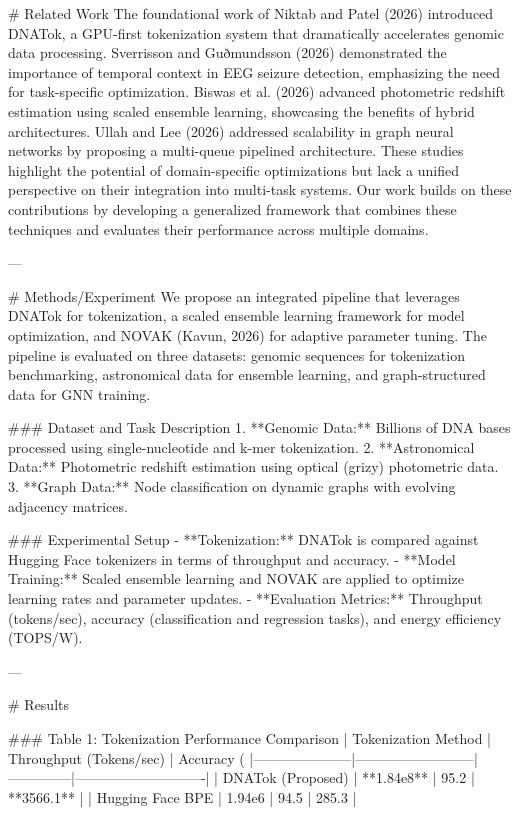 # Related Work  
The foundational work of Niktab and Patel (2026) introduced DNATok, a GPU-first tokenization system that dramatically accelerates genomic data processing. Sverrisson and Guðmundsson (2026) demonstrated the importance of temporal context in EEG seizure detection, emphasizing the need for task-specific optimization. Biswas et al. (2026) advanced photometric redshift estimation using scaled ensemble learning, showcasing the benefits of hybrid architectures. Ullah and Lee (2026) addressed scalability in graph neural networks by proposing a multi-queue pipelined architecture. These studies highlight the potential of domain-specific optimizations but lack a unified perspective on their integration into multi-task systems. Our work builds on these contributions by developing a generalized framework that combines these techniques and evaluates their performance across multiple domains.

---

# Methods/Experiment  
We propose an integrated pipeline that leverages DNATok for tokenization, a scaled ensemble learning framework for model optimization, and NOVAK (Kavun, 2026) for adaptive parameter tuning. The pipeline is evaluated on three datasets: genomic sequences for tokenization benchmarking, astronomical data for ensemble learning, and graph-structured data for GNN training.  

### Dataset and Task Description  
1. **Genomic Data:** Billions of DNA bases processed using single-nucleotide and k-mer tokenization.  
2. **Astronomical Data:** Photometric redshift estimation using optical (grizy) photometric data.  
3. **Graph Data:** Node classification on dynamic graphs with evolving adjacency matrices.  

### Experimental Setup  
- **Tokenization:** DNATok is compared against Hugging Face tokenizers in terms of throughput and accuracy.  
- **Model Training:** Scaled ensemble learning and NOVAK are applied to optimize learning rates and parameter updates.  
- **Evaluation Metrics:** Throughput (tokens/sec), accuracy (classification and regression tasks), and energy efficiency (TOPS/W).  

---

# Results  

### Table 1: Tokenization Performance Comparison  
| Tokenization Method | Throughput (Tokens/sec) | Accuracy (%
|---------------------|--------------------------|--------------|----------------------------|  
| DNATok (Proposed)   | **1.84e8**              | 95.2         | **3566.1**                 |  
| Hugging Face BPE    | 1.94e6                  | 94.5         | 285.3                      |  


